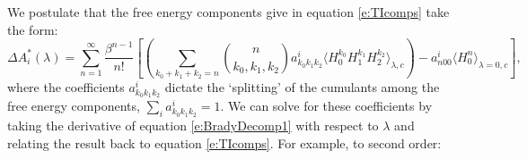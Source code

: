 \documentclass[%
 preprint,
 amsmath,amssymb,
 aps,
]{revtex4-1}
\begin{document}
We postulate that the free energy components give in equation \ref{e:TIcomps} take the form:
 \begin{equation}
\Delta A^*_i  (\lambda)=
\sum_{n=1}^{\infty}  \frac{\beta^{n-1}}{n!} 
\left[
\left(
 \sum_{k_0+k_1+k_2=n} 
{ n \choose k_0,k_1,k_2 } a^i_{k_0k_1k_2} \langle  H_0^{k_0} H_1^{k_1} H_2^{k_2} \rangle_{\lambda,c}
\right)
- a^i_{n00} \langle  H_0^{n}  \rangle_{\lambda=0,c}
\right],
\label{e:BradyDecomp1}
\end{equation}
where the coefficients $ a^i_{k_0k_1k_2}  $ dictate the `splitting' of the cumulants among the free energy components, 
$\sum_i a^i_{k_0k_1k_2} = 1$. 
We can solve for these coefficients by taking the derivative of equation \ref{e:BradyDecomp1} with respect to $\lambda$ and relating the result back to equation \ref{e:TIcomps}.  For example, to second order: 
\end{document}

